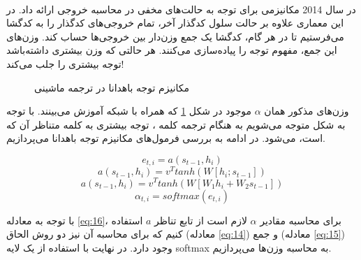 \paragraph{}{
    در سال 2014 مکانیزمی 
    \cite{DBLP:journals/corr/BahdanauCB14}
    برای توجه به حالت‌های مخفی در محاسبه خروجی ارائه داد. در این معماری 
    علاوه بر حالت سلول کدگذار آخر، تمام خروجی‌های کدگذار را به کدگشا می‌فرستیم
    تا در هر گام، کدگشا یک جمع وزن‌دار بین خروجی‌ها حساب کند. وزن‌های این جمع، 
    مفهوم توجه را پیاده‌سازی می‌کنند. هر حالتی که وزن بیشتری داشته‌باشد توجه
    بیشتری را جلب می‌کند‍!
    \begin{figure}[H]
        \caption{مکانیزم توجه باهدانا در ترجمه ماشینی}
        \label{fig:bahdanau_attn}
    \end{figure}

    وزن‌های مذکور همان 
    $\alpha$
    موجود در شکل
    \ref{fig:bahdanau_attn}
    که همراه با شبکه آموزش می‌بینند. با توجه به شکل متوجه می‌شویم به هنگام
    ترجمه کلمه 
    ،
    توجه بیشتری به کلمه متناظر آن که 
    است، می‌شود. در ادامه به بررسی فرمول‌های مکانیزم توجه باهدانا می‌پردازیم. 

    \begin{center}
        \begin{equation} \label{eq:13}
            e_{t, i} = a(s_{t - 1}, h_i)
        \end{equation}
        \begin{equation} \label{eq:14}
            a(s_{t - 1}, h_i) = v^T tanh( W[{h_i; s_{t - 1}}] )
        \end{equation}
        \begin{equation} \label{eq:15}
            a(s_{t - 1}, h_i) = v^T tanh( W[{W_1 h_i + W_2 s_{t - 1}}] )
        \end{equation}
        \begin{equation} \label{eq:16}
            \alpha_{t, i} = softmax(e_{t, i})
        \end{equation}
    \end{center}

    با توجه به معادله 
    \ref{eq:16}،
    برای محاسبه مقادیر 
    $\alpha$
    لازم است از تابع تناظر 
    $a$ 
    استفاده کنیم که برای محاسبه آن نیز دو روش الحاق 
    (معادله \ref{eq:14})
    و جمع 
    (معادله \ref{eq:15})
    وجود دارد. 
    در نهایت با استفاده از یک لایه 
    softmax
    به محاسبه وزن‌ها می‌پردازیم. 
}

